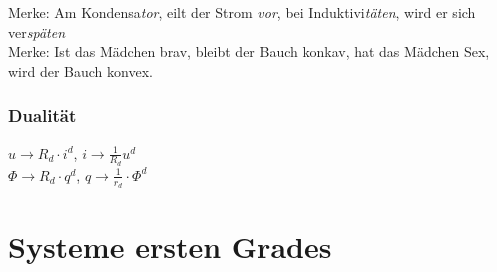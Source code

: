 \documentclass[fs, footer]{latex4ei}
\begin{document}
\begin{multicols*}{4}
    Merke: Am Kondensa\textsl{tor}, eilt der Strom \textsl{vor}, bei Induktivi\textsl{täten}, wird er sich ver\textsl{späten}\\
    Merke: Ist das Mädchen brav, bleibt der Bauch konkav, hat das Mädchen Sex, wird der Bauch konvex.\\

    \subsubsection{Dualität}
    $u\rightarrow R_d\cdot i^d$, $i\rightarrow \frac{1}{R_d}u^d$\\
    $\Phi\rightarrow R_d\cdot q^d$, $q\rightarrow \frac{1}{r_d}\cdot\Phi^d$


    \section{Systeme ersten Grades}
\end{multicols*}
\end{document}
